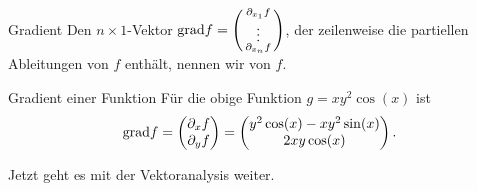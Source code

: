 \begin{Def}
{Gradient}
Den $n\times 1$-Vektor $\text{grad} f=\left(\begin{smallmatrix}\partial_{x_1}f\\\vdots\\\partial_{x_n}f\end{smallmatrix}\right)$, der zeilenweise die partiellen Ableitungen von $f$ enthält, nennen wir  von $f$.
\end{Def}
\begin{Beispiel}
{Gradient einer Funktion}
Für die obige Funktion $g=xy^2\cos(x)$ ist
\begin{equation*}
    \text{grad} f=\begin{pmatrix}\partial_x f\\\partial_y f\end{pmatrix}=\begin{pmatrix}y^2\cos(x)-xy^2\sin(x)\\2xy\cos(x)\end{pmatrix}.
\end{equation*}
\end{Beispiel}

Jetzt geht es mit der Vektoranalysis weiter.

